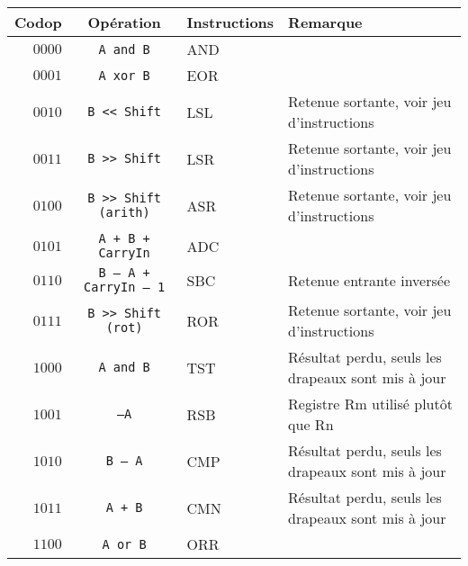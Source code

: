 \documentclass{article}
\begin{document}
    \begin{tabular}{|r|c|l|l|}
        \hline
        \textbf{Codop} & \textbf{Opération}           & \textbf{Instructions} & \textbf{Remarque}                                  \\
        \hline

        $0000$         & \texttt{A and B}             & AND                   &                                                    \\
        \hline
        $0001$         & \texttt{A xor B}             & EOR                   &                                                    \\
        \hline
        $0010$         & \texttt{B << Shift}          & LSL                   & Retenue sortante, voir jeu d'instructions          \\
        \hline
        $0011$         & \texttt{B >> Shift}          & LSR                   & Retenue sortante, voir jeu d'instructions          \\
        \hline
        $0100$         & \texttt{B >> Shift (arith)}  & ASR                   & Retenue sortante, voir jeu d'instructions          \\
        \hline
        $0101$         & \texttt{A + B + CarryIn}     & ADC                   &                                                    \\
        \hline
        $0110$         & \texttt{B – A + CarryIn – 1} & SBC                   & Retenue entrante inversée                          \\
        \hline
        $0111$         & \texttt{B >> Shift (rot)}    & ROR                   & Retenue sortante, voir jeu d'instructions          \\
        \hline
        $1000$         & \texttt{A and B}             & TST                   & Résultat perdu, seuls les drapeaux sont mis à jour \\
        \hline
        $1001$         & \texttt{–A}                  & RSB                   & Registre Rm utilisé plutôt que Rn                  \\
        \hline
        $1010$         & \texttt{B – A}               & CMP                   & Résultat perdu, seuls les drapeaux sont mis à jour \\
        \hline
        $1011$         & \texttt{A + B}               & CMN                   & Résultat perdu, seuls les drapeaux sont mis à jour \\
        \hline
        $1100$         & \texttt{A or B}              & ORR                   &                                                    \\

\end{tabular}
\end{document}
